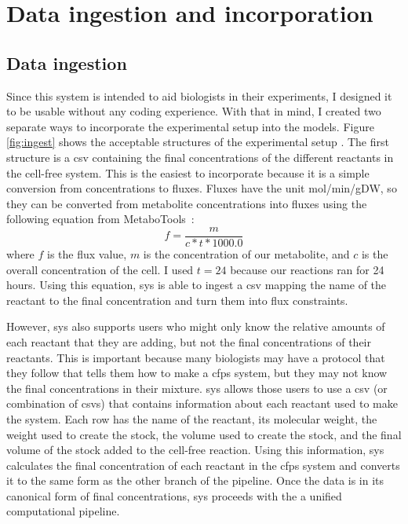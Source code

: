\section{Data ingestion and incorporation}

\subsection{Data ingestion}
Since this system is intended to aid biologists in their experiments, I designed it to be usable without any coding experience.
With that in mind, I created two separate ways to incorporate the experimental setup into the models.
Figure \ref{fig:ingest} shows the acceptable structures of the experimental setup .
The first structure is a \gls{csv} containing the final concentrations of the different reactants in the cell-free system.
This is the easiest to incorporate because it is a simple conversion from concentrations to fluxes.
Fluxes have the unit mol/min/gDW, so they can be converted from metabolite concentrations into fluxes using the following equation from MetaboTools~\cite{aurich2016metabotools}:
\begin{equation}
f = \frac{m}{c * t * 1000.0}
\end{equation}
where $f$ is the flux value, $m$ is the concentration of our metabolite, and $c$ is the overall concentration of the cell.
I used $t = 24$ because our reactions ran for 24 hours.
Using this equation, \gls{sys} is able to ingest a \gls{csv} mapping the name of the reactant to the final concentration and turn them into flux constraints.

However, \gls{sys} also supports users who might only know the relative amounts of each reactant that they are adding, but not the final concentrations of their reactants.
This is important because many biologists may have a protocol that they follow that tells them how to make a \gls{cfps} system, but they may not know the final concentrations in their mixture.
\gls{sys} allows those users to use a \gls{csv} (or combination of \glspl{csv}) that contains information about each reactant used to make the system.
Each row has the name of the reactant, its molecular weight, the weight used to create the stock, the volume used to create the stock, and the final volume of the stock added to the cell-free reaction.
Using this information, \gls{sys} calculates the final concentration of each reactant in the \gls{cfps} system and converts it to the same form as the other branch of the pipeline.
Once the data is in its canonical form of final concentrations, \gls{sys} proceeds with the a unified computational pipeline.

